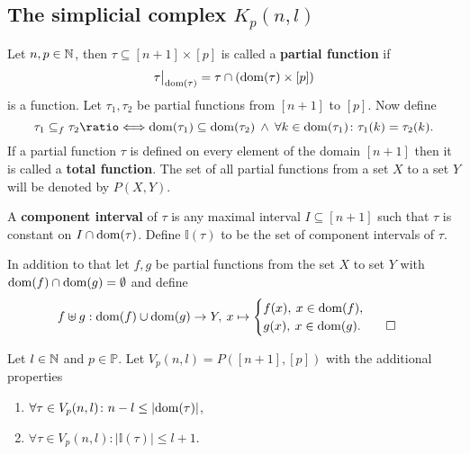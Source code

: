 \subsection{The simplicial complex $K_p(n, l)$}

\begin{defin}
  Let $n, p \in \mathbb{N}$, then $\tau \subseteq [n+1] \times [p]$ is called a \textbf{partial function} if \[\restr{\tau}{\dom(\tau)} = \tau \cap (\dom(\tau) \times [p])\] is a function. Let $\tau_1, \tau_2$ be partial functions from $[n+1]$ to $[p]$. Now define
  \begin{equation*}
    \tau_1 \subseteq_f \tau_2 \longeq \dom(\tau_1) \subseteq \dom(\tau_2) \: \land \: \forall k \in \dom(\tau_1)\colon \tau_1(k) = \tau_2(k).
  \end{equation*}
  If a partial function $\tau$ is defined on every element of the domain $[n+1]$ then it is called a \textbf{total function}. The set of all partial functions from a set $X$ to a set $Y$ will be denoted by $P(X, Y)$.
  
  A \textbf{component interval} of $\tau$ is any maximal interval $I \subseteq [n+1]$ such that $\tau$ is constant on $I \cap {\rm dom}(\tau)$. Define $\mathbb{I}(\tau)$ to be the set of component intervals of $\tau$. 

  In addition to that let $f, g$ be partial functions from the set $X$ to set $Y$ with ${\rm dom}(f) \cap {\rm dom}(g) = \emptyset$ and define 
  \begin{equation*}
    f \uplus g: {\rm dom}(f) \cup {\rm dom}(g) \to Y, \: x \mapsto \begin{cases}
      f(x), \: x \in {\rm dom}(f), \\
      g(x), \: x \in {\rm dom}(g).\qedhere
    \end{cases}
  \end{equation*}
\end{defin}

\begin{defin}
  Let $l \in \mathbb{N}$ and $p \in \mathbb{P}$. Let $V_p(n, l) = P([n+1], [p])$ with the additional properties
  \begin{enumerate}[label=\roman*.)]
    \item $\forall \tau \in V_p(n,l)\colon n - l \leq |{\rm dom}(\tau)|$,
    \item $\forall \tau \in V_p(n,l)\colon \left|\mathbb{I}(\tau)\right| \leq l+1$.\qedhere
  \end{enumerate}
\end{defin}

